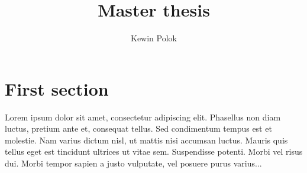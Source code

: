 \documentclass[polish, twoside, 12pt]{mwart}
\author{Kewin Polok}
\title{Master thesis}
\begin{document}
\maketitle
 
\newpage

\tableofcontents

\listoffigures
 
\listoftables

\newpage

\section{First section}

Lorem ipsum dolor sit amet, consectetur adipiscing elit. Phasellus non diam luctus, pretium ante et, consequat tellus. Sed condimentum tempus est et molestie. Nam varius dictum nisl, ut mattis nisi accumsan luctus. Mauris quis tellus eget est tincidunt ultrices ut vitae sem. Suspendisse potenti. Morbi vel risus dui. Morbi tempor sapien a justo vulputate, vel posuere purus varius...
\end{document}
